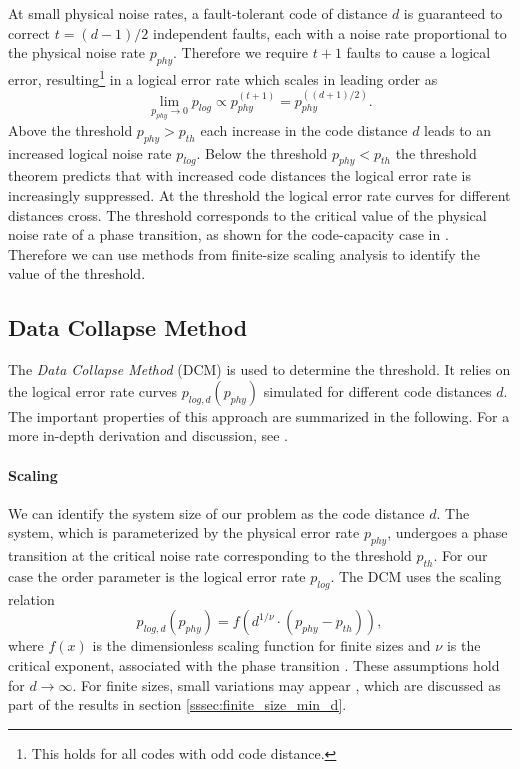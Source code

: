 At small physical noise rates,
a fault-tolerant code of distance $d$ is guaranteed to correct $t=(d-1)/2$ independent faults, each with a noise rate proportional to the physical noise rate $p_{phy}$.
Therefore we require $t+1$ faults to cause a logical error, resulting\footnote{
    This holds for all codes with odd code distance. 
} in a logical error rate which scales in leading order as 
\begin{equation}
    \lim_{p_{phy} \rightarrow 0} p_{log} \propto  p_{phy}^{(t+1)}= p_{phy}^{((d+1)/2)}.
    \label{eq:p_log_asymptotic_behavior}
\end{equation}
Above the threshold $p_{phy}>p_{th}$ each increase in the code distance $d$ leads to an increased logical noise rate $p_{log}$.
Below the threshold $p_{phy}<p_{th}$ the threshold theorem predicts that with increased code distances the logical error rate is increasingly suppressed.
At the threshold the logical error rate curves for different distances cross.
The threshold corresponds to the critical value of the physical noise rate of a phase transition, as shown for the code-capacity case in \cite{fundamental_thresholds}.
Therefore we can use methods from finite-size scaling analysis to identify the value of the threshold. 

\subsection{Data Collapse Method}\label{ssec:data_collapse_method}

The \emph{Data Collapse Method} (DCM) is used to determine the threshold. 
It relies on the logical error rate curves $p_{log,d}(p_{phy})$ simulated for different code distances $d$.
The important properties of this approach are summarized in the following. 
For a more in-depth derivation and discussion, see \cite{pyfssa,mwpm_threshold_paper}.

\paragraph*{Scaling}

We can identify the system size of our problem as the code distance $d$.
The system, which is parameterized by the physical error rate $p_{phy}$, undergoes a phase transition at the critical noise rate corresponding to the threshold $p_{th}$.
For our case the order parameter is the logical error rate $p_{log}$. 
The DCM uses the scaling relation
\begin{equation}
    p_{log,d}(p_{phy}) = f\left( d^{1/\nu} \cdot(p_{phy}-p_{th})\right),
    \label{eq:data_collapse_method}
\end{equation}
where $f(x)$ is the dimensionless scaling function for finite sizes and $\nu$ is the critical exponent, associated with the phase transition \cite{pyfssa}. 
These assumptions hold for $d\rightarrow \infty$. 
For finite sizes, small variations may appear \cite{pyfssa,mwpm_threshold_paper},
which are discussed as part of the results in section \ref{sssec:finite_size_min_d}.


